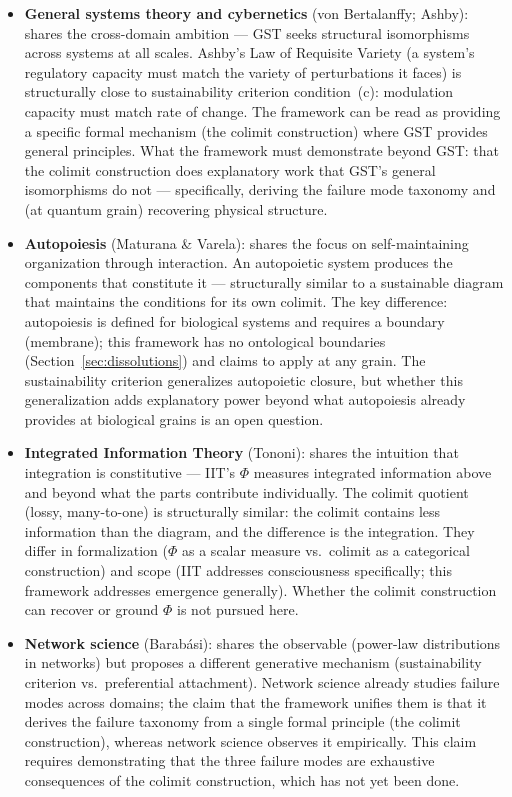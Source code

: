 \documentclass[12pt,a4paper]{article}
\begin{document}
\begin{itemize}
  \item \textbf{General systems theory and cybernetics} (von Bertalanffy; Ashby): shares the cross-domain ambition --- GST seeks structural isomorphisms across systems at all scales. Ashby's Law of Requisite Variety (a system's regulatory capacity must match the variety of perturbations it faces) is structurally close to sustainability criterion condition~(c): modulation capacity must match rate of change. The framework can be read as providing a specific formal mechanism (the colimit construction) where GST provides general principles. What the framework must demonstrate beyond GST: that the colimit construction does explanatory work that GST's general isomorphisms do not --- specifically, deriving the failure mode taxonomy and (at quantum grain) recovering physical structure.

  \item \textbf{Autopoiesis} (Maturana \& Varela): shares the focus on self-maintaining organization through interaction. An autopoietic system produces the components that constitute it --- structurally similar to a sustainable diagram that maintains the conditions for its own colimit. The key difference: autopoiesis is defined for biological systems and requires a boundary (membrane); this framework has no ontological boundaries (Section~\ref{sec:dissolutions}) and claims to apply at any grain. The sustainability criterion generalizes autopoietic closure, but whether this generalization adds explanatory power beyond what autopoiesis already provides at biological grains is an open question.

  \item \textbf{Integrated Information Theory} (Tononi): shares the intuition that integration is constitutive --- IIT's $\Phi$ measures integrated information above and beyond what the parts contribute individually. The colimit quotient (lossy, many-to-one) is structurally similar: the colimit contains less information than the diagram, and the difference is the integration. They differ in formalization ($\Phi$ as a scalar measure vs.\ colimit as a categorical construction) and scope (IIT addresses consciousness specifically; this framework addresses emergence generally). Whether the colimit construction can recover or ground $\Phi$ is not pursued here.

  \item \textbf{Network science} (Barab\'asi): shares the observable (power-law distributions in networks) but proposes a different generative mechanism (sustainability criterion vs.\ preferential attachment). Network science already studies failure modes across domains; the claim that the framework unifies them is that it derives the failure taxonomy from a single formal principle (the colimit construction), whereas network science observes it empirically. This claim requires demonstrating that the three failure modes are exhaustive consequences of the colimit construction, which has not yet been done.


\end{itemize}
\end{document}
